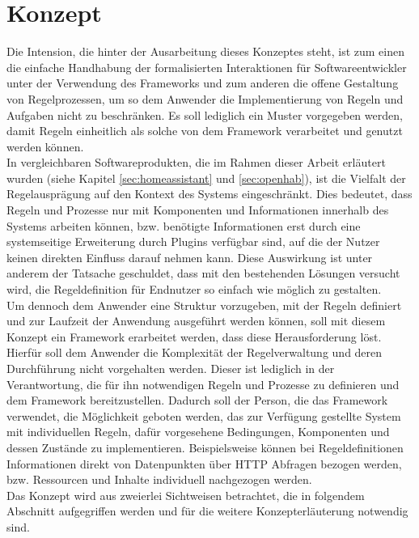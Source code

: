 \section{Konzept}
\label{sec:concept}
    Die Intension, die hinter der Ausarbeitung dieses Konzeptes steht, ist zum einen die einfache Handhabung der 
    formalisierten Interaktionen für Softwareentwickler %
    unter der Verwendung des Frameworks und zum anderen die 
    offene Gestaltung von Regelprozessen, um so dem Anwender die Implementierung von Regeln und Aufgaben nicht 
    zu beschränken. Es soll lediglich ein Muster vorgegeben werden, damit Regeln einheitlich als solche von dem Framework 
    verarbeitet und genutzt werden können. 
    \\ 
    \linebreak
    In vergleichbaren Softwareprodukten, die im Rahmen dieser Arbeit erläutert 
    wurden (siehe Kapitel \ref{sec:homeassistant} und \ref{sec:openhab}), ist die Vielfalt der Regelausprägung auf 
    den Kontext des Systems eingeschränkt. Dies bedeutet, dass 
    Regeln und Prozesse nur mit Komponenten und Informationen innerhalb des Systems arbeiten können, bzw. benötigte 
    Informationen erst durch eine systemseitige Erweiterung durch Plugins verfügbar sind, auf die der Nutzer keinen direkten 
    Einfluss darauf nehmen kann. Diese Auswirkung ist unter anderem der 
    Tatsache geschuldet, dass mit den bestehenden Lösungen versucht wird, die Regeldefinition für Endnutzer so 
    einfach wie möglich zu gestalten. 
    \\
    \linebreak
    Um dennoch dem Anwender eine Struktur vorzugeben, mit der Regeln definiert und zur Laufzeit der Anwendung ausgeführt 
    werden können, soll mit diesem Konzept ein Framework erarbeitet werden, dass diese Herausforderung löst. Hierfür soll 
    dem Anwender die Komplexität der Regelverwaltung und deren Durchführung nicht vorgehalten werden. Dieser ist lediglich 
    in der Verantwortung, die für ihn notwendigen Regeln und Prozesse zu definieren und dem Framework bereitzustellen. 
    Dadurch soll der Person, die das Framework verwendet, die Möglichkeit geboten werden, das zur Verfügung gestellte System 
    mit individuellen Regeln, dafür vorgesehene Bedingungen, Komponenten und dessen Zustände zu implementieren. Beispielsweise 
    können bei Regeldefinitionen Informationen direkt von Datenpunkten über \acs{HTTP} Abfragen bezogen werden, bzw. Ressourcen 
    und Inhalte individuell nachgezogen werden.
    \\ 
    Das Konzept wird aus zweierlei Sichtweisen betrachtet, die in folgendem Abschnitt aufgegriffen werden und für die weitere 
    Konzepterläuterung notwendig sind.

